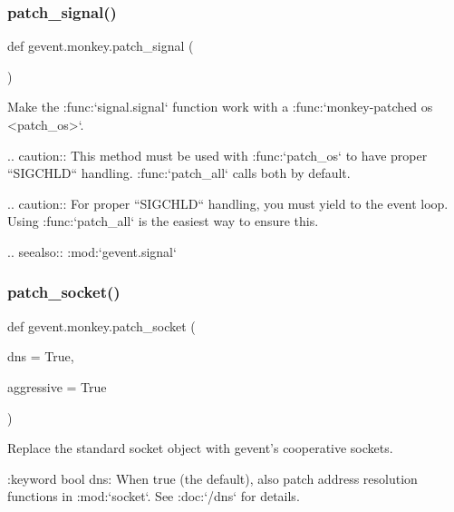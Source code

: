 \subsubsection{\texorpdfstring{patch\+\_\+signal()}{patch\_signal()}}
{\footnotesize\ttfamily def gevent.\+monkey.\+patch\+\_\+signal (\begin{DoxyParamCaption}{ }\end{DoxyParamCaption})}

\begin{DoxyVerb}Make the :func:`signal.signal` function work with a :func:`monkey-patched os <patch_os>`.

.. caution:: This method must be used with :func:`patch_os` to have proper ``SIGCHLD``
     handling. :func:`patch_all` calls both by default.

.. caution:: For proper ``SIGCHLD`` handling, you must yield to the event loop.
     Using :func:`patch_all` is the easiest way to ensure this.

.. seealso:: :mod:`gevent.signal`
\end{DoxyVerb}
 \mbox{\label{namespacegevent_1_1monkey_a788700ce9056db65b14e84481718e87c}} 
\subsubsection{\texorpdfstring{patch\+\_\+socket()}{patch\_socket()}}
{\footnotesize\ttfamily def gevent.\+monkey.\+patch\+\_\+socket (\begin{DoxyParamCaption}\item[{}]{dns = {\ttfamily True},  }\item[{}]{aggressive = {\ttfamily True} }\end{DoxyParamCaption})}

\begin{DoxyVerb}Replace the standard socket object with gevent's cooperative
sockets.

:keyword bool dns: When true (the default), also patch address
    resolution functions in :mod:`socket`. See :doc:`/dns` for details.
\end{DoxyVerb}
 \mbox{\label{namespacegevent_1_1monkey_a7e519f075b2b4d2f3e62ca378b9ab966}} 
